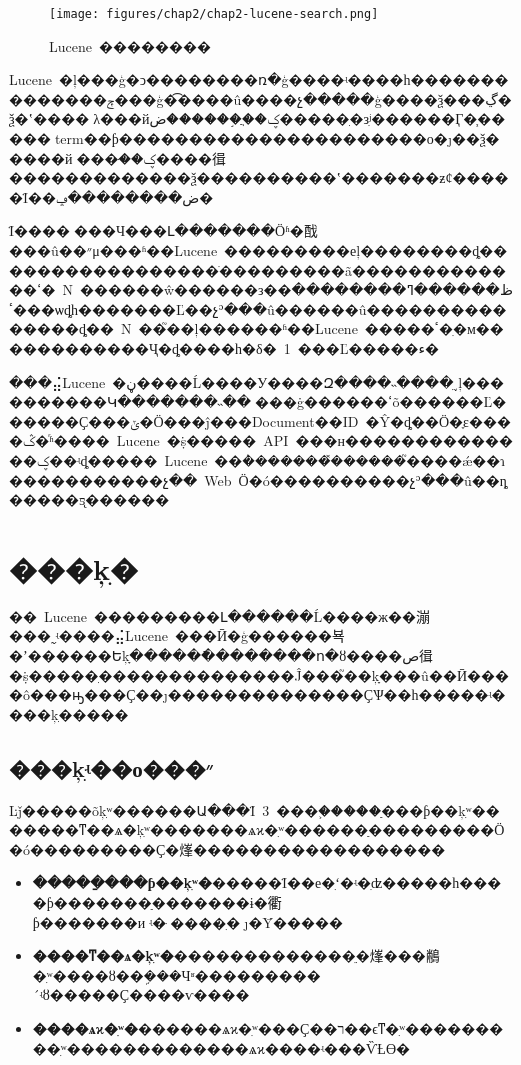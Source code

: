     \begin{figure}[htbp]
        \centering
        \texttt{[image: figures/chap2/chap2-lucene-search.png]}
        \vspace{-1em}
        \caption{Lucene~��������}
        \label{fig:lucene_index_search_process}
    \end{figure}

Lucene~�ļ���ģ�ͻ��������ռ�ģ��\cite{lucene_search_5}��ʵ����һ��������������ݼ���ģ�͡����û����չ�����ģ����ѯ���ڲ�ѯ�ʽ����׶λ���йؼ��ֲ�֣�����ض�����ִ�зִʲ������Ӷ�֧�����term��ƥ����������������������о�ȷ��ѯ�����йؼ��ּ���߼����㣬�������������ѯ����������ʽ�������ƶȼ�����Ϊ��ض��������ݡ�

Ϊ����߼���Ч���Լ�������Ӧʱ�䣬���û��״μ���ʱ��Lucene~���������еļ��������ȡ�����������������ֹ���������ã�������������ߵ�~N~������ŵ������з��ظ������ߣ��������ٴ���ѡȡһ�������Ľ��չʾ���û������û���������������ȡ��~N~��֮��ļ������ʱ��Lucene~�����ٴ�ִ�м������������Ҷ�ȡ����һ�δ�~1~���Ľ�����ء�

���⣬Lucene~�ڼ����Ĺ����У����Զ����˵����ֵ͵ļ����������Կ�������˵��͸���ġ������ߵõ������Ľ������Ҫ���ݶ�Ӧ���ĵ���Document��ID~�Ŷ�ȡ��Ӧ�ֶε����ݣ�ͬʱ����~Lucene~�ṩ�����~API~���н��������������ؼ��ʵȡ�����~Lucene~��ܵ��������̽�����֮����ǽ��ɿ�����������չ��~Web~Ӧ�ó����������չʾ���û��ȵ�����ƽ̨������

\section{���ķִ�}

��~Lucene~���������Լ������Ĺ����ж��漰���˷ִʵ����⣬Lucene~���Ӣ�ģ������뵥�ʼ������Եķָ������ֿ�������ո�ȣ����ص㣬�ṩ�����ִ��������������Ĵ���֮��ķָ���û��Ӣ����ô���ԣ���Ҫ��ȷ��������������ҪѰ��һ�����ʵ����ķִ�����

\subsection{���ķִʵ��о���״}

Ŀǰ�����õķִʷ������Ա���Ϊ~3~���ࣺ�����ַ���ƥ��ķִʷ�������ͳ��ѧ�ķִʷ�������ѧϰ�ִʷ�\cite{chinese_segmentation_1}�����ַ���������Ӧ�ó���������Ҫ�㷨������������������

\begin{itemize}
  \item \textbf{�����ַ���ƥ��ķִʷ�}�����Ϊ��е�ִʻ�ʵ�ִʣ�����һ����ƥ�������ַ�������ɨ�衢ƥ�������иʵ�ּ򵥣����ִ�׼ȷ�Ȳ�����
  \item \textbf{����ͳ��ѧ�ķִʷ�}�������������ֵ�㷨���䳤�ִʷ����ȣ��ܹ���Чʶ���������´ʵȣ�����Ҫ����ѵ����
  \item \textbf{����ѧϰ�ִʷ�}������ѧϰ�ִʷ���Ҫ��ר��ϵͳ�ִʷ���������ִʷ���\cite{lucene_index_4}����������ѧϰ����ʵ���ѶȽϴ�
\end{itemize}

